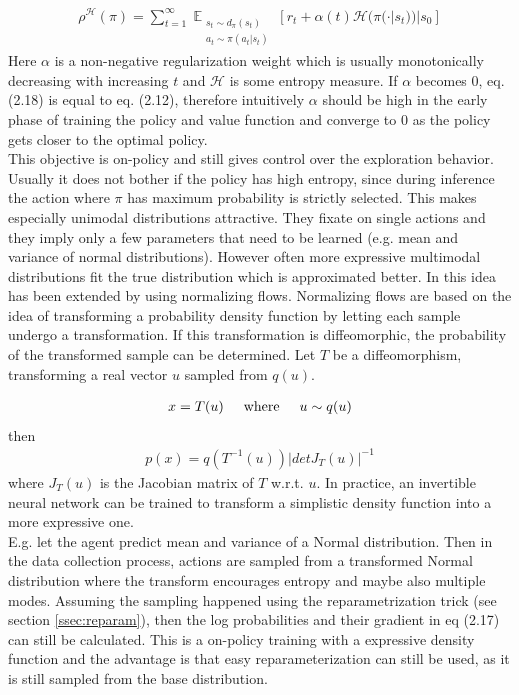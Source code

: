 \begin{align}
\rho^{\mathcal{H}}(\pi) = \sum_{t=1}^{\infty}\mathop{\mathbb{E}}_{\substack{s_t \sim d_\pi(s_t) \\ a_t \sim \pi(a_t|s_t)}} \left[ r_t + \alpha(t) \mathcal{H}(\pi(\cdot | s_t))|s_0 \right]
\end{align}
Here $\alpha$ is a non-negative regularization weight which is usually monotonically decreasing with increasing $t$ and $\mathcal{H}$ is some entropy measure. If $\alpha$ becomes $0$, eq. (2.18) is equal to eq. (2.12), therefore intuitively $\alpha$ should be high in the early phase of training the policy and value function and converge to $0$ as the policy gets closer to the optimal policy.\\
This objective is on-policy and still gives control over the exploration behavior. Usually it does not bother if the policy has high entropy, since during inference the action where $\pi$ has maximum probability is strictly selected. This makes especially unimodal distributions attractive. They fixate on single actions and they imply only a few parameters that need to be learned (e.g. mean and variance of normal distributions). However often more expressive multimodal distributions fit the true distribution which is approximated better. 
In \cite{DBLP:journals/corr/abs-1906-02771} this idea has been extended by using  normalizing flows. Normalizing flows \cite{papamakarios2019normalizing} are based on the idea of transforming a probability density function by letting each sample undergo a transformation. If this transformation is diffeomorphic, the probability of the transformed sample can be determined. Let $T$ be a diffeomorphism, transforming a real vector $u$ sampled from $q(u)$.

\begin{align}
	x=T(u) \text{\hspace{5mm}where\hspace{5mm}} u\sim q(u)
\end{align}
then
\begin{align}
p(x)=q(T^{-1}(u)) |detJ_T(u)|^{-1}
\end{align}
where $J_T(u)$ is the Jacobian matrix of $T$ w.r.t. $u$. In practice, an invertible neural network can be trained to transform a simplistic density function into a more expressive one.\\
E.g. let the agent predict mean and variance of a Normal distribution. Then in the data collection process, actions are sampled from a transformed Normal distribution where the transform encourages entropy and maybe also multiple modes. Assuming the sampling happened using the reparametrization trick (see section \ref{ssec:reparam}), then the log probabilities and their gradient in eq (2.17) can still be calculated. This is a on-policy training with a expressive density function and the advantage is that easy reparameterization can still be used, as it is still sampled from the base distribution.

